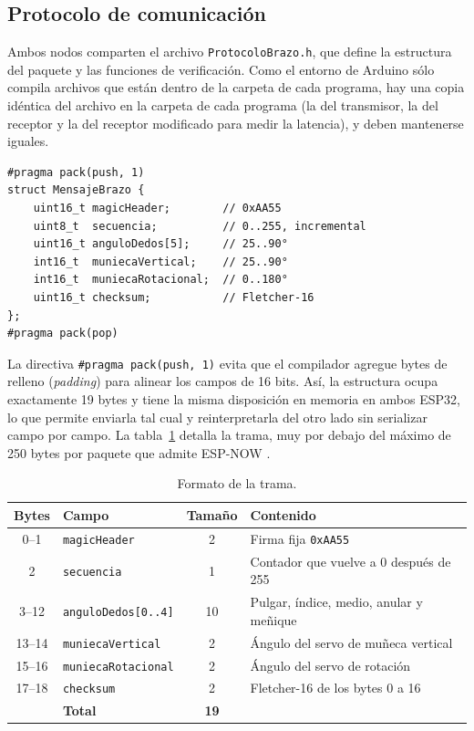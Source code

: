 \subsection{Protocolo de comunicación}
\label{sec:protocolo}

Ambos nodos comparten el archivo \texttt{ProtocoloBrazo.h}, que define la estructura del paquete y las funciones de verificación. Como el entorno de Arduino sólo compila archivos que están dentro de la carpeta de cada programa, hay una copia idéntica del archivo en la carpeta de cada programa (la del transmisor, la del receptor y la del receptor modificado para medir la latencia), y deben mantenerse iguales.

\begin{lstlisting}[caption={Estructura del paquete (\texttt{ProtocoloBrazo.h}).}, label={cod:paquete}]
#pragma pack(push, 1)
struct MensajeBrazo {
    uint16_t magicHeader;        // 0xAA55
    uint8_t  secuencia;          // 0..255, incremental
    uint16_t anguloDedos[5];     // 25..90°
    int16_t  muniecaVertical;    // 25..90°
    int16_t  muniecaRotacional;  // 0..180°
    uint16_t checksum;           // Fletcher-16
};
#pragma pack(pop)
\end{lstlisting}

La directiva \texttt{\#pragma pack(push, 1)} evita que el compilador agregue bytes de relleno (\textit{padding}) para alinear los campos de 16 bits. Así, la estructura ocupa exactamente 19 bytes y tiene la misma disposición en memoria en ambos ESP32, lo que permite enviarla tal cual y reinterpretarla del otro lado sin serializar campo por campo. La tabla~\ref{tab:paquete} detalla la trama, muy por debajo del máximo de 250 bytes por paquete que admite ESP-NOW \cite{espnow_idf}.

\begin{table}[H]
\centering
\begin{tabular}{c l c l}
\toprule
\textbf{Bytes} & \textbf{Campo} & \textbf{Tamaño} & \textbf{Contenido} \\
\midrule
0--1   & \texttt{magicHeader}       & 2 & Firma fija \texttt{0xAA55} \\
2      & \texttt{secuencia}         & 1 & Contador que vuelve a 0 después de 255 \\
3--12  & \texttt{anguloDedos[0..4]} & 10 & Pulgar, índice, medio, anular y meñique \\
13--14 & \texttt{muniecaVertical}   & 2 & Ángulo del servo de muñeca vertical \\
15--16 & \texttt{muniecaRotacional} & 2 & Ángulo del servo de rotación \\
17--18 & \texttt{checksum}          & 2 & Fletcher-16 de los bytes 0 a 16 \\
\midrule
       & \textbf{Total}             & \textbf{19} & \\
\bottomrule
\end{tabular}
\caption{Formato de la trama.}
\label{tab:paquete}
\end{table}

